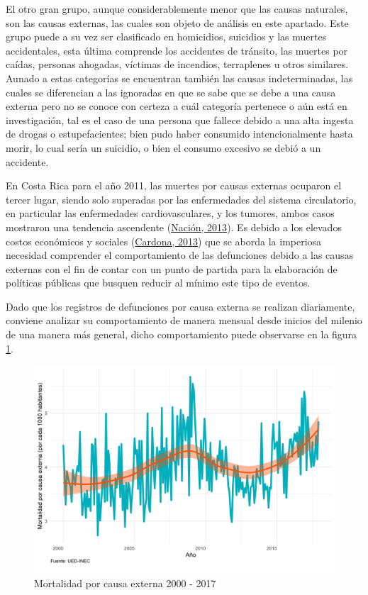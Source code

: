 \documentclass[
]{article}
\begin{document}
El otro gran grupo, aunque considerablemente menor que las causas
naturales, son las causas externas, las cuales son objeto de análisis en
este apartado. Este grupo puede a su vez ser clasificado en homicidios,
suicidios y las muertes accidentales, esta última comprende los
accidentes de tránsito, las muertes por caídas, personas ahogadas,
víctimas de incendios, terraplenes u otros similares. Aunado a estas
categorías se encuentran también las causas indeterminadas, las cuales
se diferencian a las ignoradas en que se sabe que se debe a una causa
externa pero no se conoce con certeza a cuál categoría pertenece o aún
está en investigación, tal es el caso de una persona que fallece debido
a una alta ingesta de drogas o estupefacientes; bien pudo haber
consumido intencionalmente hasta morir, lo cual sería un suicidio, o
bien el consumo excesivo se debió a un accidente.

En Costa Rica para el año 2011, las muertes por causas externas ocuparon
el tercer lugar, siendo solo superadas por las enfermedades del sistema
circulatorio, en particular las enfermedades cardiovasculares, y los
tumores, ambos casos mostraron una tendencia ascendente
(\protect\hyperlink{ref-nacion}{Nación, 2013}). Es debido a los elevados
costos económicos y sociales
(\protect\hyperlink{ref-ccpexternas}{Cardona, 2013}) que se aborda la
imperiosa necesidad comprender el comportamiento de las defunciones
debido a las causas externas con el fin de contar con un punto de
partida para la elaboración de políticas públicas que busquen reducir al
mínimo este tipo de eventos.

Dado que los registros de defunciones por causa externa se realizan
diariamente, conviene analizar su comportamiento de manera mensual desde
inicios del milenio de una manera más general, dicho comportamiento
puede observarse en la figura \ref{fig:externaplotgeneral}.

\begin{figure}[!h]
\includegraphics[width=1\linewidth,height=1\textheight]{Tesis_files/figure-latex/externaplotgeneral-1} \caption{Mortalidad por causa externa 2000 - 2017}\label{fig:externaplotgeneral}
\end{figure}
\end{document}
